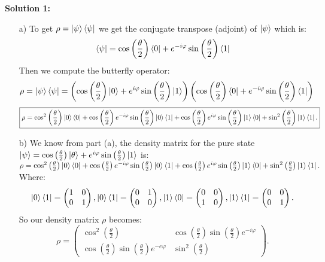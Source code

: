 \documentclass{article}
\renewcommand{\phi}{\varphi}
\begin{document}
\textbf{Solution 1:}
\begin{enumerate}
    \item[a)] To get $\rho=\ket{\psi}\bra{\psi}$ we get the conjugate transpose (adjoint) of $\ket{\psi}$ which is: $$\bra{\psi}=\cos\left(\frac{\theta}{2}\right)\bra{0}+e^{-i\phi}\sin\left(\frac{\theta}{2}\right)\bra{1}$$ 
    Then we compute the butterfly operator:
    $$\rho=\ket{\psi}\bra{\psi}= \left(\cos \left( \frac{\theta}{2} \right) \ket{0} + e^{i\phi}\sin \left(\frac{\theta}{2} \right) \ket{1}\right)\left(\cos\left(\frac{\theta}{2}\right)\bra{0}+e^{-i\phi}\sin\left(\frac{\theta}{2}\right)\bra{1}\right)$$
    $$\boxed{\rho = \cos^2\left(\frac{\theta}{2}\right) \ket{0}\bra{0} + \cos\left(\frac{\theta}{2}\right) e^{-i\phi} \sin\left(\frac{\theta}{2}\right) \ket{0}\bra{1} + \cos\left(\frac{\theta}{2}\right) e^{i\phi} \sin\left(\frac{\theta}{2}\right) \ket{1}\bra{0} + \sin^2\left(\frac{\theta}{2}\right) \ket{1}\bra{1}.}$$
    \item[b)] We know from part (a), the density matrix for the pure state $\ket{\psi}=\cos \left( \frac{\theta}{2} \right) \ket{\theta} + e^{i\phi}\sin \left(\frac{\theta}{2} \right) \ket{1}$ is: $\rho = \cos^2\left(\frac{\theta}{2}\right) \ket{0}\bra{0} + \cos\left(\frac{\theta}{2}\right) e^{-i\phi} \sin\left(\frac{\theta}{2}\right) \ket{0}\bra{1} + \cos\left(\frac{\theta}{2}\right) e^{i\phi} \sin\left(\frac{\theta}{2}\right) \ket{1}\bra{0} + \sin^2\left(\frac{\theta}{2}\right) \ket{1}\bra{1}.$ Where: $$\ket{0}\bra{1}=\begin{pmatrix}1&0\\0&1\end{pmatrix}, \ket{0}\bra{1}=\begin{pmatrix}0&1\\0&0\end{pmatrix},\ket{1}\bra{0}=\begin{pmatrix}0&0\\1&0\end{pmatrix},\ket{1}\bra{1}=\begin{pmatrix} 0&0\\0&1\end{pmatrix}.$$ So our density matrix $\rho$ becomes: $$\rho=\begin{pmatrix}\cos^2\left(\frac{\theta}{2}\right)&\cos\left(\frac{\theta}{2}\right)\sin\left(\frac{\theta}{2}\right)e^{-i\phi}\\ \cos\left(\frac{\theta}{2}\right)\sin\left(\frac{\theta}{2}\right)e^{-e\phi}&\sin^2\left(\frac{\theta}{2}\right)\end{pmatrix}.$$

\end{enumerate}
\end{document}

